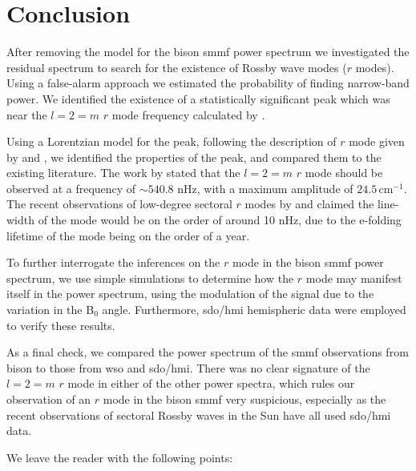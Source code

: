 \section{Conclusion}\label{sec:r-mode_conclusion}

After removing the model for the \gls{bison} \gls{smmf} power spectrum we investigated the residual spectrum to search for the existence of Rossby wave modes ($r$ modes). Using a false-alarm approach we estimated the probability of finding narrow-band power. We identified the existence of a statistically significant peak which was near the $l=2=m$ $r$ mode frequency calculated by \citet{lanza_sectoral_2019}.

Using a Lorentzian model for the peak, following the description of $r$ mode given by \citet{loptien_global-scale_2018} and \citet{liang_time-distance_2019}, we identified the properties of the peak, and compared them to the existing literature. The work by \citet{lanza_sectoral_2019} stated that the $l=2=m$ $r$ mode should be observed at a frequency of $\sim 540.8$ nHz, with a maximum amplitude of $24.5 \, \mathrm{cm}^{-1}$. The recent observations of low-degree sectoral $r$ modes by \citet{loptien_global-scale_2018} and \citet{liang_time-distance_2019} claimed the line-width of the mode would be on the order of around 10 nHz, due to the e-folding lifetime of the mode being on the order of a year.

To further interrogate the inferences on the $r$ mode in the \gls{bison} \gls{smmf} power spectrum, we use simple simulations to determine how the $r$ mode may manifest itself in the power spectrum, using the modulation of the signal due to the variation in the B$_0$ angle. Furthermore, \gls{sdo/hmi} hemispheric data were employed to verify these results.

As a final check, we compared the power spectrum of the \gls{smmf} observations from \gls{bison} to those from \gls{wso} and \gls{sdo/hmi}. There was no clear signature of the $l=2=m$ $r$ mode in either of the other power spectra, which rules our observation of an $r$ mode in the \gls{bison} \gls{smmf} very suspicious, especially as the recent observations of sectoral Rossby waves in the Sun have all used \gls{sdo/hmi} data.

We leave the reader with the following points:

